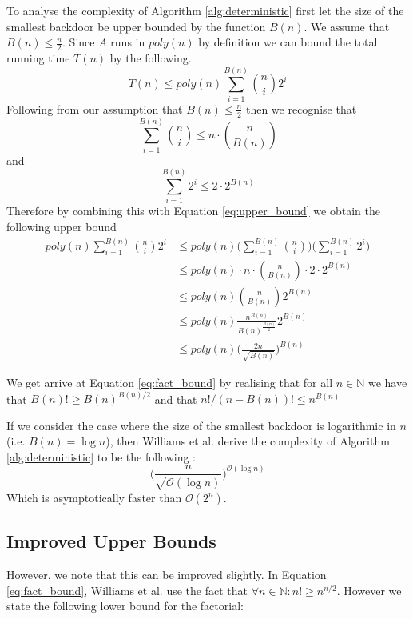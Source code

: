 To analyse the complexity of Algorithm \ref{alg:deterministic} first let
the size of the smallest backdoor be upper bounded by the function $B(n)$.
We assume that $B(n) \leq \frac{n}{2}$.
Since $A$ runs in $poly(n)$ by definition we can bound the total running time $T(n)$
by the following.
\begin{equation} \label{eq:upper_bound}
    T(n) \leq poly(n)\sum_{i = 1}^{B(n)} \binom{n}{i} 2^i
\end{equation}
Following from our assumption that $B(n) \leq \frac{n}{2}$ then we recognise that
\begin{equation*}
    \sum_{i = 1}^{B(n)} \binom{n}{i} \leq n\cdot\binom{n}{B(n)}
\end{equation*}
and
\begin{equation*}
    \sum_{i = 1}^{B(n)} 2^i \leq 2 \cdot 2^{B(n)}
\end{equation*}
Therefore by combining this with Equation \ref{eq:upper_bound}
we obtain the following upper bound
\begin{align}
    poly(n)\sum_{i = 1}^{B(n)} \binom{n}{i} 2^i &\leq poly(n)\Big(\sum_{i=1}^{B(n)} \binom{n}{i}\Big)\Big(\sum_{i=1}^{B(n)} 2^i \Big) \nonumber\\
    &\leq poly(n) \cdot n \cdot \binom{n}{B(n)} \cdot 2 \cdot 2^{B(n)} \nonumber\\
    &\leq poly(n) \binom{n}{B(n)} 2^{B(n)} \nonumber\\
    &\leq poly(n) \frac{n^{B(n)}}{B(n)^{\frac{B(n)}{2}}} 2^{B(n)} \label{eq:fact_bound}\\
    &\leq poly(n) \Bigg( \frac{2n}{\sqrt{B(n)}} \Bigg)^{B(n)} \label{eq:det_door_bound}
\end{align}

We get arrive at Equation \ref{eq:fact_bound} by realising that
for all $n \in \mathbb{N}$ we have that $B(n)! \geq B(n)^{B(n) / 2}$ and
that $n! / (n - B(n))! \leq n^{B(n)}$

If we consider the case where the size of the smallest backdoor is
logarithmic in $n$ (i.e. $B(n) = \log n$), then Williams et al. derive the
complexity of Algorithm \ref{alg:deterministic} to be the following
\cite{backdoor_typical}:
\begin{equation}
    \Bigg( \frac{n}{\sqrt{\mathcal{O}(\log n)}} \Bigg)^{\mathcal{O}(\log n)}
\end{equation}
Which is asymptotically faster than $\mathcal{O}(2^n)$.

\subsection{Improved Upper Bounds}
However, we note that this can be improved slightly.
In Equation \ref{eq:fact_bound}, Williams et al. use the fact that
$\forall n \in \mathbb{N}: n! \geq n^{n / 2}$. However we state
the following lower bound for the factorial:

